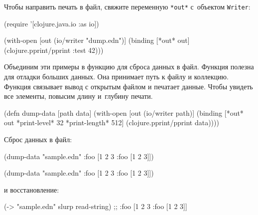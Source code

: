 \fi


Чтобы направить печать в файл, свяжите переменную \verb|*out*| с~объектом
\verb|Writer|:

\begin{english}
  \begin{clojure}
(require '[clojure.java.io :as io])

(with-open [out (io/writer "dump.edn")]
  (binding [*out* out]
    (clojure.pprint/pprint {:test 42})))
  \end{clojure}
\end{english}

Объединим эти примеры в функцию для сброса данных в файл. Функция полезна для
отладки больших данных. Она принимает путь к файлу и коллекцию. Функция
связывает вывод с открытым файлом и печатает данные. Чтобы увидеть все элементы,
повысим длину и~глубину печати.

\begin{english}
  \begin{clojure}
(defn dump-data
  [path data]
  (with-open [out (io/writer path)]
    (binding [*out* out
              *print-level* 32
              *print-length* 512]
      (clojure.pprint/pprint data))))
  \end{clojure}
\end{english}

\noindent
Сброс данных в файл:

\ifx\DEVICETYPE\MOBILE

\begin{english}
  \begin{clojure}
(dump-data "sample.edn"
  {:foo [1 2 3 {:foo [1 2 3]}]})
  \end{clojure}
\end{english}

\else

\begin{english}
  \begin{clojure}
(dump-data "sample.edn" {:foo [1 2 3 {:foo [1 2 3]}]})
  \end{clojure}
\end{english}

\fi

\noindent
и восстановление:

\begin{english}
  \begin{clojure}
(-> "sample.edn" slurp read-string)
;; {:foo [1 2 3 {:foo [1 2 3]}]}
  \end{clojure}
\end{english}

